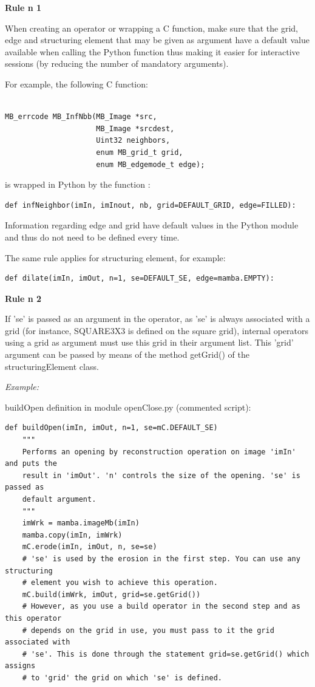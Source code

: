 \documentclass[a4paper,10pt,oneside]{article}
\begin{document}
\textbf{Rule n\textdegree{} 1}

When creating an operator or wrapping a C function, make sure that the grid, edge
and structuring element that may be given as argument have a default value
available when calling the Python function thus making it easier for
interactive sessions (by reducing the number of mandatory arguments).

For example, the following C function:
\lstset{language=C} 
\begin{lstlisting} 

MB_errcode MB_InfNbb(MB_Image *src,
                     MB_Image *srcdest,
                     Uint32 neighbors,
                     enum MB_grid_t grid,
                     enum MB_edgemode_t edge);
\end{lstlisting}
is wrapped in Python by the function :
\lstset{language=Python}
\begin{lstlisting} 
def infNeighbor(imIn, imInout, nb, grid=DEFAULT_GRID, edge=FILLED):
\end{lstlisting}

Information regarding edge and grid have default values in the Python module 
and thus do not need to be defined every time.

The same rule applies for structuring element, for example:
\begin{lstlisting} 
def dilate(imIn, imOut, n=1, se=DEFAULT_SE, edge=mamba.EMPTY):
\end{lstlisting}

\textbf{Rule n\textdegree{} 2}

If 'se' is passed as an argument in the operator, as 'se' is always associated
with a grid (for instance, SQUARE3X3 is defined on the square grid), internal
operators using a grid as argument must use this grid in their argument list. 
This 'grid' argument can be passed by means of the method getGrid() of the 
structuringElement class.\par

\emph{Example:}

buildOpen definition in module openClose.py (commented script):

\lstset{language=Python}
\begin{lstlisting}
def buildOpen(imIn, imOut, n=1, se=mC.DEFAULT_SE)
    """
    Performs an opening by reconstruction operation on image 'imIn' and puts the
    result in 'imOut'. 'n' controls the size of the opening. 'se' is passed as 
    default argument.
    """
    imWrk = mamba.imageMb(imIn)
    mamba.copy(imIn, imWrk)
    mC.erode(imIn, imOut, n, se=se)
    # 'se' is used by the erosion in the first step. You can use any structuring
    # element you wish to achieve this operation.
    mC.build(imWrk, imOut, grid=se.getGrid())
    # However, as you use a build operator in the second step and as this operator
    # depends on the grid in use, you must pass to it the grid associated with 
    # 'se'. This is done through the statement grid=se.getGrid() which assigns
    # to 'grid' the grid on which 'se' is defined.
\end{lstlisting}
\end{document}
